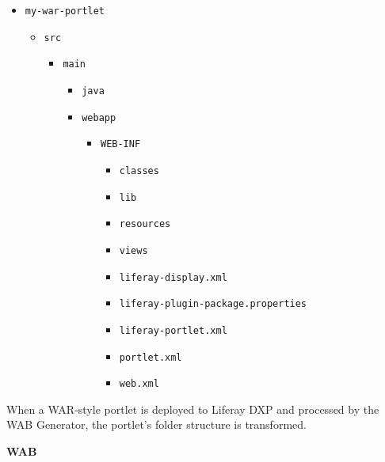 \begin{itemize}
\tightlist
\item
  \texttt{my-war-portlet}

  \begin{itemize}
  \tightlist
  \item
    \texttt{src}

    \begin{itemize}
    \tightlist
    \item
      \texttt{main}

      \begin{itemize}
      \tightlist
      \item
        \texttt{java}
      \item
        \texttt{webapp}

        \begin{itemize}
        \tightlist
        \item
          \texttt{WEB-INF}

          \begin{itemize}
          \tightlist
          \item
            \texttt{classes}
          \item
            \texttt{lib}
          \item
            \texttt{resources}
          \item
            \texttt{views}
          \item
            \texttt{liferay-display.xml}
          \item
            \texttt{liferay-plugin-package.properties}
          \item
            \texttt{liferay-portlet.xml}
          \item
            \texttt{portlet.xml}
          \item
            \texttt{web.xml}
          \end{itemize}
        \end{itemize}
      \end{itemize}
    \end{itemize}
  \end{itemize}
\end{itemize}

When a WAR-style portlet is deployed to Liferay DXP and processed by the
WAB Generator, the portlet's folder structure is transformed.

\textbf{WAB}

